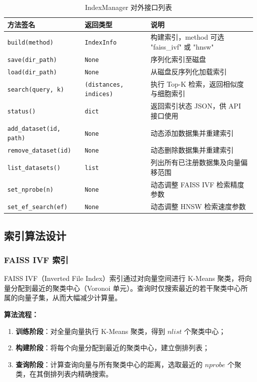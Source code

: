 \documentclass[a4paper]{article}
\begin{document}
\begin{table}[H]
\centering
\small
\caption{IndexManager 对外接口列表}
\begin{tabularx}{\linewidth}{p{4cm}p{2.5cm}X}
\toprule
方法签名 & 返回类型 & 说明 \\
\midrule
\texttt{build(method)} & \texttt{IndexInfo} & 构建索引，method 可选 "faiss\_ivf" 或 "hnsw" \\
\texttt{save(dir\_path)} & \texttt{None} & 序列化索引至磁盘 \\
\texttt{load(dir\_path)} & \texttt{None} & 从磁盘反序列化加载索引 \\
\texttt{search(query, k)} & \texttt{(distances, indices)} & 执行 Top-K 检索，返回相似度与细胞索引 \\
\texttt{status()} & \texttt{dict} & 返回索引状态 JSON，供 API 接口使用 \\
\texttt{add\_dataset(id, path)} & \texttt{None} & 动态添加数据集并重建索引 \\
\texttt{remove\_dataset(id)} & \texttt{None} & 动态删除数据集并重建索引 \\
\texttt{list\_datasets()} & \texttt{list} & 列出所有已注册数据集及向量偏移范围 \\
\texttt{set\_nprobe(n)} & \texttt{None} & 动态调整 FAISS IVF 检索精度参数 \\
\texttt{set\_ef\_search(ef)} & \texttt{None} & 动态调整 HNSW 检索速度参数 \\
\bottomrule
\end{tabularx}
\end{table}

\subsection{索引算法设计}

\subsubsection{FAISS IVF 索引}
FAISS IVF（Inverted File Index）索引通过对向量空间进行 K-Means 聚类，将向量分配到最近的聚类中心（Voronoi 单元）。查询时仅搜索最近的若干聚类中心所属的向量子集，从而大幅减少计算量。

\textbf{算法流程：}
\begin{enumerate}
    \item \textbf{训练阶段}：对全量向量执行 K-Means 聚类，得到 $nlist$ 个聚类中心；
    \item \textbf{构建阶段}：将每个向量分配到最近的聚类中心，建立倒排列表；
    \item \textbf{查询阶段}：计算查询向量与所有聚类中心的距离，选取最近的 $nprobe$ 个聚类，在其倒排列表内精确搜索。
\end{enumerate}
\end{document}
